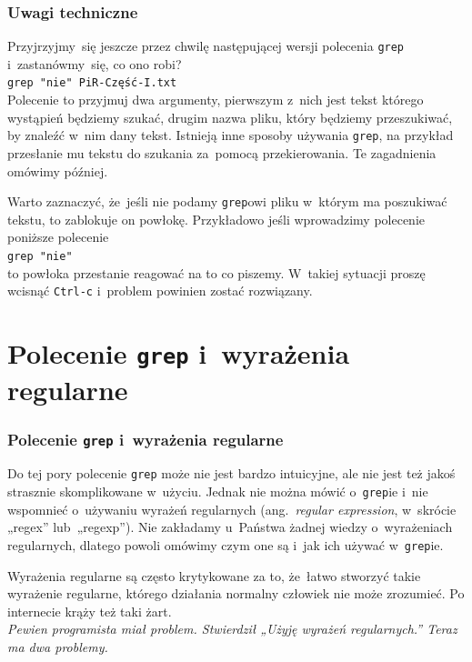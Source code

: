\documentclass[10pt,t]{beamer}
\begin{document}
\begin{frame}
  \frametitle{Uwagi techniczne}


  Przyjrzyjmy~się jeszcze przez chwilę następującej wersji polecenia
  \texttt{grep} i~zastanówmy~się, co ono robi? \\
  \texttt{grep "nie"{} PiR-Część-I.txt} \\
  Polecenie to przyjmuj dwa argumenty, pierwszym z~nich jest tekst którego
  wystąpień będziemy szukać, drugim nazwa pliku, który będziemy
  przeszukiwać, by znaleźć w~nim dany tekst. Istnieją inne sposoby
  używania \texttt{grep}, na przykład przesłanie mu tekstu do szukania
  za~pomocą przekierowania. Te zagadnienia omówimy później.

  Warto zaznaczyć, że~jeśli nie podamy \texttt{grep}owi pliku
  w~którym ma poszukiwać tekstu, to zablokuje on powłokę. Przykładowo
  jeśli wprowadzimy polecenie poniższe polecenie \\
  \texttt{grep "nie"} \\
  to powłoka przestanie reagować na to co piszemy. W~takiej sytuacji
  proszę wcisnąć \texttt{Ctrl-c} i~problem powinien zostać rozwiązany.

\end{frame}










\section{Polecenie \texttt{grep} i~wyrażenia regularne}


\begin{frame}
  \frametitle{Polecenie \texttt{grep} i~wyrażenia regularne}


  Do tej pory polecenie \texttt{grep} może nie jest bardzo intuicyjne,
  ale nie jest też jakoś strasznie skomplikowane w~użyciu. Jednak nie
  można mówić o~\texttt{grep}ie i~nie wspomnieć o~używaniu
  {wyrażeń regularnych} (ang.~\textit{regular expression}, w~skrócie
  „regex” lub~„regexp”). Nie zakładamy u~Państwa żadnej wiedzy
  o~wyrażeniach regularnych, dlatego powoli omówimy czym one są i~jak
  ich używać w~\texttt{grep}ie.

  Wyrażenia regularne są często krytykowane za to, że~łatwo stworzyć
  takie wyrażenie regularne, którego działania normalny człowiek nie może
  zrozumieć. Po internecie krąży też taki żart. \\
  \textit{Pewien programista miał problem. Stwierdził „Użyję wyrażeń
    regularnych.” Teraz ma dwa problemy.}

\end{frame}
\end{document}
